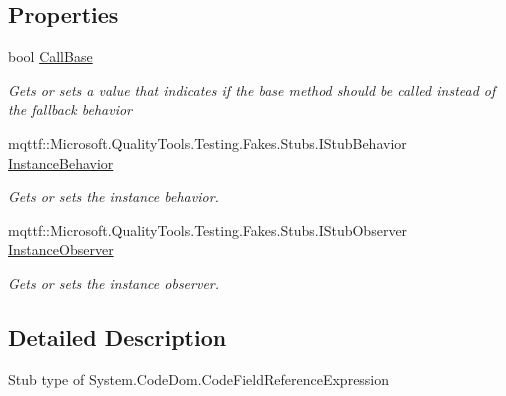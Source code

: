 \subsection*{Properties}
\begin{DoxyCompactItemize}
\item 
bool \hyperlink{class_system_1_1_code_dom_1_1_fakes_1_1_stub_code_field_reference_expression_aae83f37aaec4b0629fc1ca60faf35eea}{Call\-Base}
\begin{DoxyCompactList}\small\item\em Gets or sets a value that indicates if the base method should be called instead of the fallback behavior\end{DoxyCompactList}\item 
mqttf\-::\-Microsoft.\-Quality\-Tools.\-Testing.\-Fakes.\-Stubs.\-I\-Stub\-Behavior \hyperlink{class_system_1_1_code_dom_1_1_fakes_1_1_stub_code_field_reference_expression_a518cf596236d10b4d74ed636e156852f}{Instance\-Behavior}
\begin{DoxyCompactList}\small\item\em Gets or sets the instance behavior.\end{DoxyCompactList}\item 
mqttf\-::\-Microsoft.\-Quality\-Tools.\-Testing.\-Fakes.\-Stubs.\-I\-Stub\-Observer \hyperlink{class_system_1_1_code_dom_1_1_fakes_1_1_stub_code_field_reference_expression_a89dac4e6212424b754f60ecf04b9ed9e}{Instance\-Observer}
\begin{DoxyCompactList}\small\item\em Gets or sets the instance observer.\end{DoxyCompactList}\end{DoxyCompactItemize}


\subsection{Detailed Description}
Stub type of System.\-Code\-Dom.\-Code\-Field\-Reference\-Expression



